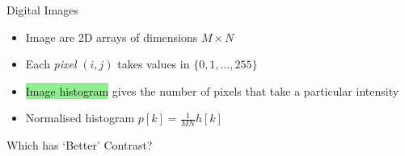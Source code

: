 \begin{frame}{Digital Images}
    \begin{itemize}
    \itemsep = 1em
        \item<1-> Image are 2D arrays of dimensions $M\times N$
        \item<1-> Each \emph{pixel} $(i,j)$ takes values in $\{0,1,\ldots,255\}$
        \item<2-> \colorbox{LightGreen}{Image histogram} gives the number of pixels that take a particular intensity\\
        \item<4-> Normalised histogram $p[k] = \displaystyle\frac{1}{MN}h[k]$
    \end{itemize}
\end{frame}

\begin{frame}{Which has `Better' Contrast?}
\end{frame}

